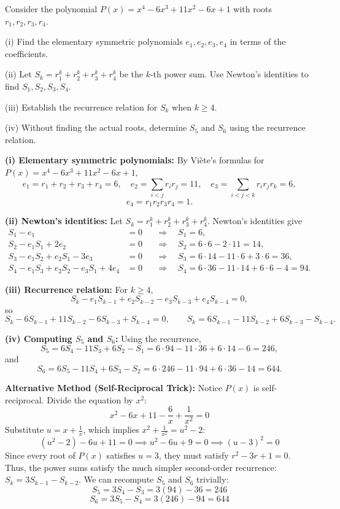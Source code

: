 \begin{problem}
Consider the polynomial $P(x) = x^4 - 6x^3 + 11x^2 - 6x + 1$ with roots $r_1, r_2, r_3, r_4$.

(i) Find the elementary symmetric polynomials $e_1, e_2, e_3, e_4$ in terms of the coefficients.

(ii) Let $S_k = r_1^k + r_2^k + r_3^k + r_4^k$ be the $k$-th power sum. Use Newton's identities to find $S_1, S_2, S_3, S_4$.

(iii) Establish the recurrence relation for $S_k$ when $k \geq 4$.

(iv) Without finding the actual roots, determine $S_5$ and $S_6$ using the recurrence relation.
\end{problem}

\begin{solution}
\textbf{(i) Elementary symmetric polynomials:}  
By Vi\`ete's formulas for $P(x)=x^4-6x^3+11x^2-6x+1$,
\[
e_1=r_1+r_2+r_3+r_4=6,\quad
e_2=\sum_{i<j}r_ir_j=11,\quad
e_3=\sum_{i<j<k}r_ir_jr_k=6,
\]
\[
e_4=r_1r_2r_3r_4=1.
\]

\textbf{(ii) Newton's identities:}  
Let $S_k=r_1^k+r_2^k+r_3^k+r_4^k$. Newton's identities give
\begin{align*}
S_1-e_1&=0 &&\Rightarrow\quad S_1=6,\\
S_2-e_1S_1+2e_2&=0 &&\Rightarrow\quad S_2=6\cdot6-2\cdot11=14,\\
S_3-e_1S_2+e_2S_1-3e_3&=0 &&\Rightarrow\quad S_3=6\cdot14-11\cdot6+3\cdot6=36,\\
S_4-e_1S_3+e_2S_2-e_3S_1+4e_4&=0 &&\Rightarrow\quad S_4=6\cdot36-11\cdot14+6\cdot6-4=94.
\end{align*}

\textbf{(iii) Recurrence relation:}  
For $k\ge4$,
\[
S_k-e_1S_{k-1}+e_2S_{k-2}-e_3S_{k-3}+e_4S_{k-4}=0,
\]
so
\[
S_k-6S_{k-1}+11S_{k-2}-6S_{k-3}+S_{k-4}=0,
\qquad
S_k=6S_{k-1}-11S_{k-2}+6S_{k-3}-S_{k-4}.
\]

\textbf{(iv) Computing $S_5$ and $S_6$:}  
Using the recurrence,
\[
S_5=6S_4-11S_3+6S_2-S_1=6\cdot94-11\cdot36+6\cdot14-6=246,
\]
and
\[
S_6=6S_5-11S_4+6S_3-S_2=6\cdot246-11\cdot94+6\cdot36-14=644.
\]

\textbf{Alternative Method (Self-Reciprocal Trick):}  
Notice $P(x)$ is self-reciprocal. Divide the equation by $x^2$:
\[ x^2 - 6x + 11 - \frac{6}{x} + \frac{1}{x^2} = 0 \]
Substitute $u = x + \frac{1}{x}$, which implies $x^2 + \frac{1}{x^2} = u^2 - 2$:
\[ (u^2 - 2) - 6u + 11 = 0 \implies u^2 - 6u + 9 = 0 \implies (u - 3)^2 = 0 \]
Since every root of $P(x)$ satisfies $u=3$, they must satisfy $r^2 - 3r + 1 = 0$.
Thus, the power sums satisfy the much simpler second-order recurrence: $S_k = 3S_{k-1} - S_{k-2}$.
We can recompute $S_5$ and $S_6$ trivially:
\[ S_5 = 3S_4 - S_3 = 3(94) - 36 = 246 \]
\[ S_6 = 3S_5 - S_4 = 3(246) - 94 = 644 \]
\end{solution}

